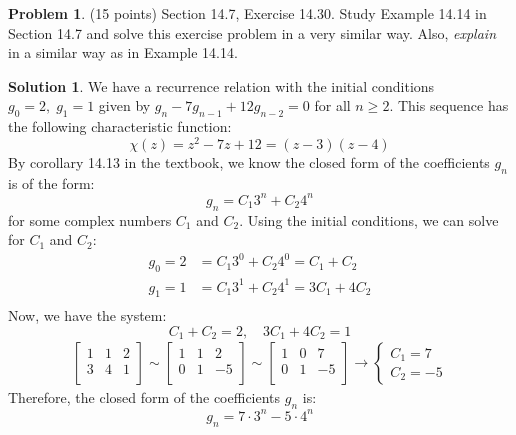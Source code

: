 \documentclass{article}
\theoremstyle{definition}
\newtheorem{problem}{Problem}
\newtheorem*{solution}{Solution}
\begin{document}
\newpage
\begin{problem} (15 points) Section 14.7, Exercise 14.30.  Study Example 14.14
in Section 14.7 and solve this exercise problem in a very similar way.  Also, 
\textit{explain} in a similar way as in Example 14.14.
\end{problem}
\begin{solution}
We have a recurrence relation with the initial conditions $g_0 = 2 ,\; g_1 = 1$
given by $g_n - 7g_{n-1} + 12g_{n-2} = 0$ for all $n \geq 2$.
This sequence has the following characteristic function:
$$\chi(z) = z^2 - 7z + 12 = (z - 3)(z - 4)$$
By corollary 14.13 in the textbook, we know the closed form of the coefficients $g_n$ is of the form:
$$ g_n = C_1 3^n + C_2 4^n $$
for some complex numbers $C_1$ and $C_2$.
Using the initial conditions, we can solve for $C_1$ and $C_2$:
\begin{align*}
g_0 = 2 &= C_1 3^0 + C_2 4^0 = C_1 + C_2 \\
g_1 = 1 &= C_1 3^1 + C_2 4^1 = 3C_1 + 4C_2 \\
\end{align*}
Now, we have the system:
$$ C_1 + C_2 = 2, \quad 3C_1 + 4C_2 = 1 $$
\begin{align*} 
  \left[\begin{array}{cc|c} 1 & 1 & 2 \\ 3 & 4 & 1 \\ \end{array}\right] \sim
  \left[\begin{array}{cc|c} 1 & 1 & 2 \\ 0 & 1 & -5 \\ \end{array}\right] \sim
  \left[\begin{array}{cc|c} 1 & 0 & 7 \\ 0 & 1 & -5 \\ \end{array}\right] \rightarrow
  \begin{cases} C_1 = 7 \\ C_2 = -5 \end{cases}
\end{align*}
Therefore, the closed form of the coefficients $g_n$ is:
$$ g_n = 7 \cdot 3^n - 5 \cdot 4^n $$
\end{solution}
\end{document}
